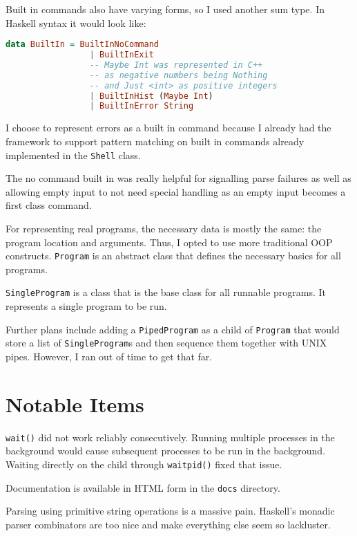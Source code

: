 \documentclass{article}
\begin{document}
Built in commands also have varying forms, so I used another sum type.
In Haskell syntax it would look like:

\begin{lstlisting}[language=Haskell]
	data BuiltIn = BuiltInNoCommand
	             | BuiltInExit
	             -- Maybe Int was represented in C++
	             -- as negative numbers being Nothing
	             -- and Just <int> as positive integers
	             | BuiltInHist (Maybe Int)
	             | BuiltInError String
\end{lstlisting}

I choose to represent errors as a built in command because I already had the framework to support
pattern matching on built in commands already implemented in the \texttt{Shell} class.

The no command built in was really helpful for signalling parse failures
as well as allowing empty input to not need special handling as an empty input becomes a first class command.

For representing real programs, the necessary data is mostly the same:
the program location and arguments.
Thus, I opted to use more traditional OOP constructs.
\texttt{Program} is an abstract class that defines the necessary basics for all programs.

\texttt{SingleProgram} is a class that is the base class for all runnable programs.
It represents a single program to be run.

Further plans include adding a \texttt{PipedProgram} as a child of \texttt{Program}
that would store a list of \texttt{SingleProgram}s and then sequence them together with UNIX pipes.
However, I ran out of time to get that far.

\section{Notable Items}
\texttt{wait()} did not work reliably consecutively.
Running multiple processes in the background would cause subsequent processes to be run in the background.
Waiting directly on the child through \texttt{waitpid()} fixed that issue.

Documentation is available in HTML form in the \texttt{docs} directory.

Parsing using primitive string operations is a massive pain.
{\scriptsize Haskell's monadic parser combinators are too nice and make everything else seem so lackluster.}
\end{document}
